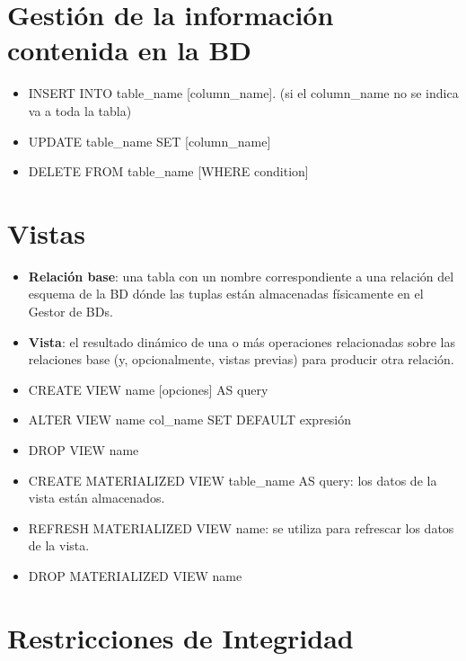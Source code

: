 \documentclass{article}
\begin{document}
\section{Gestión de la información contenida en la BD}
\begin{itemize}
    \item INSERT INTO table\_name [column\_name]. (si el column\_name no se indica va a toda la tabla)

    \item UPDATE table\_name SET [column\_name]

    \item DELETE FROM table\_name [WHERE condition]
\end{itemize}

\newpage

\section{Vistas}
\begin{itemize}
    \item \textbf{Relación base}: una tabla con un nombre correspondiente a una relación del esquema de la BD dónde las tuplas están almacenadas físicamente en el Gestor de BDs.

    \item \textbf{Vista}: el resultado dinámico de una o más operaciones relacionadas sobre las relaciones base (y, opcionalmente, vistas previas) para producir otra relación.
\end{itemize}

\begin{itemize}
    \item CREATE VIEW name [opciones] AS query

    \item ALTER VIEW name col\_name SET DEFAULT expresión

    \item DROP VIEW name

    \item CREATE MATERIALIZED VIEW table\_name AS query: los datos de la vista están almacenados.

    \item REFRESH MATERIALIZED VIEW name: se utiliza para refrescar los datos de la vista.

    \item DROP MATERIALIZED VIEW name
\end{itemize}

\section{Restricciones de Integridad}
\end{document}
